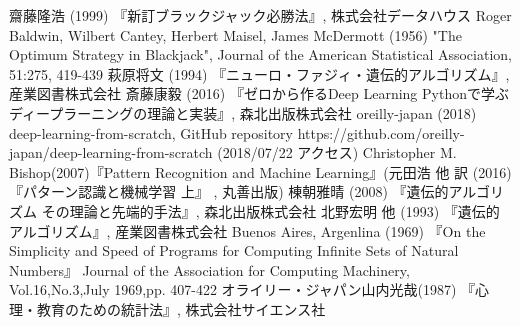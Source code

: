 \begin{thebibliography}{9}
   齋藤隆浩 (1999) 『新訂ブラックジャック必勝法』, 株式会社データハウス
   Roger Baldwin, Wilbert Cantey, Herbert Maisel, James McDermott (1956) "The Optimum Strategy in Blackjack", Journal of the American Statistical Association, 51:275, 419-439
   萩原将文 (1994) 『ニューロ・ファジィ・遺伝的アルゴリズム』, 産業図書株式会社
   斎藤康毅 (2016) 『ゼロから作るDeep Learning Pythonで学ぶディープラーニングの理論と実装』, 森北出版株式会社
   oreilly-japan (2018) deep-learning-from-scratch, GitHub repository https://github.com/oreilly-japan/deep-learning-from-scratch (2018/07/22 アクセス) 
   Christopher M. Bishop(2007)『Pattern Recognition and Machine Learning』(元田浩 他 訳 (2016) 『パターン認識と機械学習 上』 , 丸善出版)
   棟朝雅晴 (2008) 『遺伝的アルゴリズム その理論と先端的手法』, 森北出版株式会社
   北野宏明 他 (1993) 『遺伝的アルゴリズム』, 産業図書株式会社
   Buenos Aires, Argenlina (1969) 『On the Simplicity and Speed of Programs for Computing Infinite Sets of Natural Numbers』 Journal of the Association for Computing Machinery, Vol.16,No.3,July 1969,pp. 407-422
   オライリー・ジャパン山内光哉(1987) 『心理・教育のための統計法』, 株式会社サイエンス社
\end{thebibliography}

